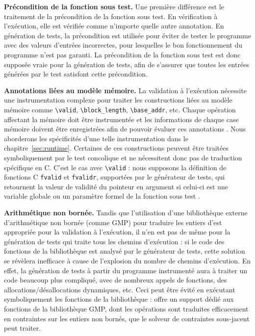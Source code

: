 \textbf{Précondition de la fonction sous test.}
Une première différence est le traitement de la précondition de la fonction sous
test.
En vérification à l'exécution, elle est vérifiée comme n'importe quelle autre
annotation.
En génération de tests, la précondition est utilisée pour éviter de tester le
programme avec des valeurs d'entrées incorrectes, pour lesquelles le bon
fonctionnement du programme n'est pas garanti.
La précondition de la fonction sous test est donc supposée vraie pour la
génération de tests, afin de s'assurer que toutes les entrées générées par le
test satisfont cette précondition.

\textbf{Annotations liées au modèle mémoire.}
La validation à l'exécution nécessite une instrumentation complexe pour traiter
les constructions \eacsl liées au modèle mémoire comme \lstinline'\valid',
\lstinline'\block_length', \lstinline'\base_addr', etc.
Chaque opération affectant la mémoire doit être instrumentée et les informations
de chaque case mémoire doivent être enregistrées afin de pouvoir évaluer ces
annotations \cite{Kosmatov/RV13}.
Nous aborderons les spécificités d'une telle instrumentation dans le
chapitre~\ref{sec:runtime}.
Certaines de ces constructions peuvent être traitées symboliquement par le test
concolique et ne nécessitent donc pas de traduction spécifique en C.
C'est le cas avec \lstinline'\valid' : nous supposons la définition de fonctions
C \lstinline'fvalid' et \lstinline'fvalidr', supportées par le générateur de
tests, qui retournent la valeur de validité du pointeur en argument si celui-ci
est une variable globale ou un paramètre formel de la fonction sous test
\cite{Chebaro/ICSSEA12}.

\textbf{Arithmétique non bornée.}
Tandis que l'utilisation d'une bibliothèque externe d'arithmétique non bornée
(comme GMP) pour traduire les entiers d'\eacsl est appropriée pour la validation
à l'exécution, il n'en est pas de même pour la génération de tests qui traite
tous les chemins d'exécution : si le code des fonctions de la bibliothèque est
analysé par le générateur de tests, cette solution se révèlera inefficace
à cause de l'explosion du nombre de chemins d'exécution.
En effet, la génération de tests à partir du programme instrumenté aura à
traiter un code beaucoup plus compliqué, avec de nombreux appels de fonctions, 
des allocations/désallocations dynamiques, etc.
Ceci peut être évité en exécutant symboliquement les fonctions de la
bibliothèque : \pathcrawler offre un support dédié aux fonctions de la
bibliothèque GMP, dont les opérations sont traduites efficacement en contraintes
sur les entiers non bornés, que le solveur de contraintes sous-jacent peut
traiter.

